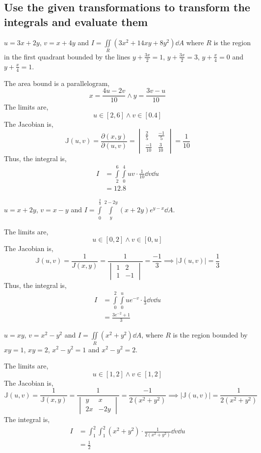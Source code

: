 \subsection{Use the given transformations to transform the integrals and evaluate them}
\begin{asign}
	$u=3x+2y$, $v=x+4y$ and $I=\iint\limits_R (3x^2+14xy+8y^2)\dd{A}$ where $R$ is the region in the first quadrant bounded by the lines $y+\frac{3x}{2}=1$, $y+\frac{3x}{2}=3$, $y+\frac{x}{4}=0$ and $y+\frac{x}{4}=1$.
\end{asign}
\begin{anse}
	The area bound is a parallelogram,
	\[x=\frac{4u-2v}{10}\land y=\frac{3v-u}{10}\]
	The limits are,
	\[u\in[2,6]\land v\in[0.4]\]
	The Jacobian is,
	\[\mathbb{J}(u,v)=\frac{\partial(x,y)}{\partial(u,v)}=\begin{vmatrix}
		\frac{2}{5} & \frac{-1}{5}\\
		\frac{-1}{10} & \frac{3}{10}
	\end{vmatrix}=\frac{1}{10}\]
	Thus, the integral is,
	\[\begin{split}
		I&=\int\limits_2^6\int\limits_0^4 uv\cdot\frac{1}{10}\dd{v}\dd{u}\\
		&=12.8
	\end{split}\]
\end{anse}
\begin{asign}
	$u=x+2y$, $v=x-y$ and $I=\int\limits_0^\frac{2}{3}\int\limits_y^{2-2y}(x+2y)e^{y-x}\dd{A}$.
\end{asign}
\begin{anse}
	The limits are,
	\[u\in[0,2]\land v\in[0,u]\]
	The Jacobian is,
	\[\mathbb{J}(u,v)=\frac{1}{J(x,y)}=\frac{1}{\begin{vmatrix}
			1 & 2\\
			1 & -1
	\end{vmatrix}}=\frac{-1}{3}\implies |\mathbb{J}(u,v)|=\frac{1}{3}\]
	Thus, the integral is,
	\[\begin{split}
		I&=\int\limits_0^2\int\limits_0^u ue^{-v}\cdot \frac{1}{3}\dd{v}\dd{u}\\
		&=\frac{3e^{-2}+1}{3}
	\end{split}\]
\end{anse}
\begin{asign}
	$u=xy$, $v=x^2-y^2$ and $I=\iint\limits_R(x^2+y^2)\dd{A}$, where $R$ is the region bounded by $xy=1$, $xy=2$, $x^2-y^2=1$ and $x^2-y^2=2$.
\end{asign}
\begin{anse}
	The limits are,
	\[u\in[1,2]\land v\in[1,2]\]
	The Jacobian is,
	\[\mathbb{J}(u,v)=\frac{1}{\mathbb{J}(x,y)}=\frac{1}{\begin{vmatrix}
			y& x\\
			2x & -2y
	\end{vmatrix}}=\frac{-1}{2(x^2+y^2)} \implies |\mathbb{J}(u,v)|=\frac{1}{2(x^2+y^2)}\]
	The integral is,
	\[\begin{split}
		I&=\int_1^2\int_1^2 (x^2+y^2)\cdot \frac{1}{2(x^2+y^2)} \dd{v}\dd{u}\\
		&=\frac{1}{2}
	\end{split}\]
\end{anse}
